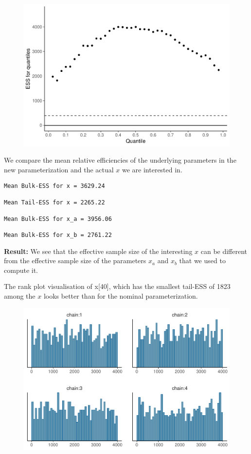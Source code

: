 \documentclass[american,]{article}
\begin{document}
\begin{figure}[tp]
  \centering
  \includegraphics[width=0.6\linewidth]{graphics/quantile-ess-fit-alt1-2-1.pdf}
\end{figure}

We compare the mean relative efficiencies of the underlying parameters
in the new parameterization and the actual \(x\) we are interested in.

\begin{verbatim}
Mean Bulk-ESS for x = 3629.24
\end{verbatim}

\begin{verbatim}
Mean Tail-ESS for x = 2265.22
\end{verbatim}

\begin{verbatim}
Mean Bulk-ESS for x_a = 3956.06
\end{verbatim}

\begin{verbatim}
Mean Bulk-ESS for x_b = 2761.22
\end{verbatim}

\textbf{Result:} We see that the effective sample size of the
interesting \(x\) can be different from the effective sample size of the
parameters \(x_a\) and \(x_b\) that we used to compute it.

The rank plot visualisation of x{[}40{]}, which has the smallest
tail-ESS of 1823 among the \(x\) looks better than for the nominal
parameterization.

\begin{figure}[tp]
  \centering
  \includegraphics[width=0.6\linewidth]{graphics/hist-fit-alt1-2-1.pdf}
\end{figure}
\end{document}
